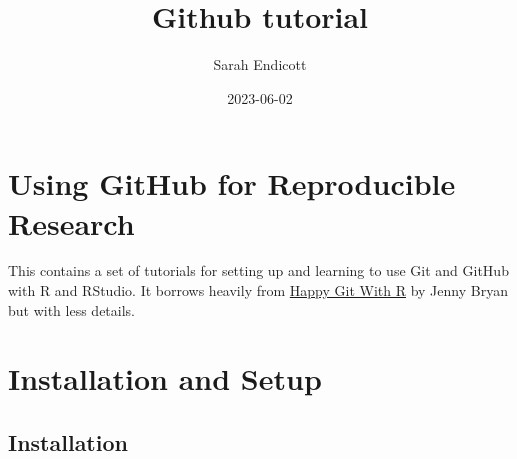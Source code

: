 \documentclass[
  letterpaper,
  DIV=11,
  numbers=noendperiod]{scrreprt}
\title{Github tutorial}
\author{Sarah Endicott}
\date{2023-06-02}
\renewcommand*\contentsname{Table of contents}
\newcommand\contentsname{Table of contents}
\begin{document}
\maketitle
\ifdefined\Shaded\renewenvironment{Shaded}{\begin{tcolorbox}[breakable, sharp corners, interior hidden, boxrule=0pt, borderline west={3pt}{0pt}{shadecolor}, enhanced, frame hidden]}{\end{tcolorbox}}\fi

\renewcommand*\contentsname{Table of contents}
{
\hypersetup{linkcolor=}
\setcounter{tocdepth}{2}
\tableofcontents
}

\hypertarget{using-github-for-reproducible-research}{%
\chapter*{Using GitHub for Reproducible
Research}\label{using-github-for-reproducible-research}}


This contains a set of tutorials for setting up and learning to use Git
and GitHub with R and RStudio. It borrows heavily from
\href{https://happygitwithr.com/index.html}{Happy Git With R} by Jenny
Bryan but with less details.


\hypertarget{installation-and-setup}{%
\chapter{Installation and Setup}\label{installation-and-setup}}

\hypertarget{installation}{%
\section{Installation}\label{installation}}
\end{document}
